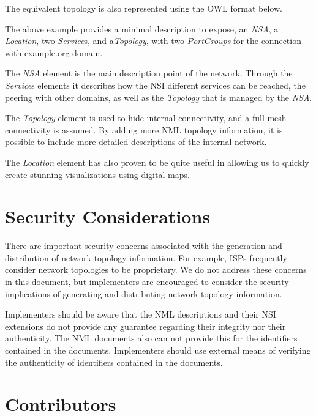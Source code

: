 \documentclass[12pt]{article}  %
\begin{document}


The equivalent topology is also represented using the OWL format below.






The above example provides a minimal description to expose, 
an \emph{NSA}, a \emph{Location}, two \emph{Service}s, and a\emph{Topology}, with two \emph{PortGroups} for the connection with example.org domain.

The \emph{NSA} element is the main description point of the network. Through the \emph{Service}s elements it describes how 
the NSI different services can be reached, the peering with other domains, as well as the \emph{Topology} that is managed by the \emph{NSA}.


The \emph{Topology} element is used to hide internal connectivity, and 
a full-mesh connectivity is assumed. By adding more NML topology information, it is possible 
to include more detailed descriptions of the internal network.


The \emph{Location} element has also proven to be quite useful in allowing 
us to quickly create stunning visualizations using digital maps.


\section{Security Considerations} %
\label{sec:security_considerations}


There are important security concerns associated with the generation and distribution of network topology information. For example, ISPs frequently consider network topologies to be proprietary. We do not address these concerns in this document, but implementers are encouraged to consider the security implications of generating and distributing network topology information. 

Implementers should be aware that the NML descriptions and their NSI extensions do not provide any guarantee regarding their integrity nor their authenticity. The NML documents also can not provide this for the identifiers contained in the documents. Implementers should use external means of verifying the authenticity of identifiers contained in the documents.

\section{Contributors}
\end{document}
